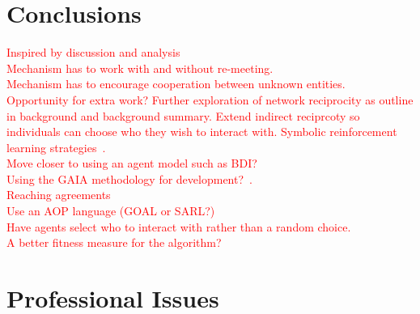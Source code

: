 \documentclass[]{final_report}
\begin{document}
\chapter{Conclusions}
\textcolor{red}{Inspired by discussion and analysis\\}
\textcolor{red}{Mechanism has to work with and without re-meeting.\\
Mechanism has to encourage cooperation between unknown entities.\\
Opportunity for extra work? Further exploration of network reciprocity as outline in background and background summary. Extend indirect reciprcoty so individuals can choose who they wish to interact with. Symbolic reinforcement learning strategies~\cite{harper2017reinforcement}.\\
Move closer to using an agent model such as BDI?\\
Using the GAIA methodology for development?~\cite{wooldridge2000gaia}.\\
Reaching agreements\\
Use an AOP language (GOAL or SARL?)\\
Have agents select who to interact with rather than a random choice.\\
A better fitness measure for the algorithm?}


\newpage
{}

\label{endpage}

\chapter{Professional Issues}
\end{document}
